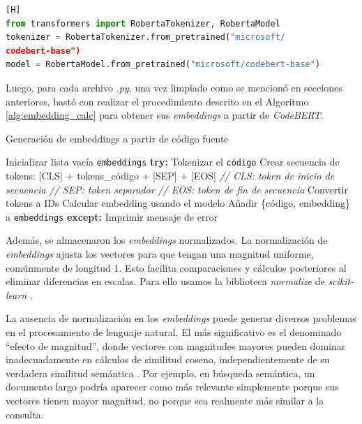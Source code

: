 \documentclass[11pt,a4paper,twoside,openany]{tesis}
\begin{document}
\begin{lstlisting}[language=Python, label={lst:codebert_import}, caption={Importación de CodeBERT}][H]
from transformers import RobertaTokenizer, RobertaModel
tokenizer = RobertaTokenizer.from_pretrained("microsoft/
codebert-base")
model = RobertaModel.from_pretrained("microsoft/codebert-base")
\end{lstlisting}

Luego, para cada archivo \emph{.py}, una vez limpiado como se mencionó en secciones anteriores, bastó con realizar el procedimiento descrito en el Algoritmo \ref{alg:embedding_calc} para obtener sus \emph{embeddings} a partir de \emph{CodeBERT}.

\begin{algorithm}[H]
\caption{Generación de embeddings a partir de código fuente}
\label{alg:embedding_calc}
\begin{algorithmic}[1]
\State Inicializar lista vacía \texttt{embeddings}
    \State \textbf{try:}
	        \State Tokenizar el \texttt{código}
	        \State Crear secuencia de tokens:
	        \State \hspace{\algorithmicindent} [CLS] + tokens\_código + [SEP] + [EOS]
	        \State \hspace{\algorithmicindent} \textit{// CLS: token de inicio de secuencia}
	        \State \hspace{\algorithmicindent} \textit{// SEP: token separador}
	        \State \hspace{\algorithmicindent} \textit{// EOS: token de fin de secuencia}
	        \State Convertir tokens a IDs
	        \State Calcular embedding usando el modelo
	        \State Añadir \{código, embedding\} a \texttt{embeddings}
    \State \textbf{except:}
	        \State Imprimir mensaje de error
\EndFor
\end{algorithmic}
\end{algorithm}

Además, se almacenaron los \emph{embeddings} normalizados. La normalización de \emph{embeddings} ajusta los vectores para que tengan una magnitud uniforme, comúnmente de longitud 1. Esto facilita comparaciones y cálculos posteriores al eliminar diferencias en escalas. Para ello usamos la biblioteca \emph{normalize} de \emph{scikit-learn} \cite{sklearn_normalize}.

La ausencia de normalización en los \emph{embeddings} puede generar diversos problemas en el procesamiento de lenguaje natural. El más significativo es el denominado ``efecto de magnitud'', donde vectores con magnitudes mayores pueden dominar inadecuadamente en cálculos de similitud coseno, independientemente de su verdadera similitud semántica \cite{mu2018all}. Por ejemplo, en búsqueda semántica, un documento largo podría aparecer como más relevante simplemente porque sus vectores tienen mayor magnitud, no porque sea realmente más similar a la consulta.
\end{document}
